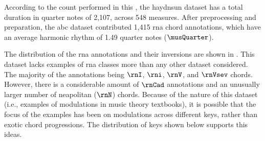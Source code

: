 
According to the count performed in this \thesisdiss{}, the
\gls{haydnsun} dataset has a total duration in quarter notes
of 2,107, across 548 measures. After preprocessing and
preparation, the \gls{abc} dataset contributed 1,415
\gls{rna} chord annotations, which have an average harmonic
rhythm of 1.49 quarter notes ($\musQuarter$).

The distribution of the \gls{rna} annotations and their
inversions are shown in . This
dataset lacks examples of \gls{rna} classes more than any
other dataset considered. The majority of the annotations
being $\rnI$, $\rni$, $\rnV$, and $\rnVsev$ chords. However,
there is a considerable amount of $\rnCad$ annotations and
an unusually larger number of \gls{neapolitan} ($\rnN$)
chords. Because of the nature of this dataset (i.e.,
examples of modulations in music theory textbooks), it is
possible that the focus of the examples has been on
modulations across different keys, rather than exotic chord
progressions. The distribution of keys shown below supports
this ideas.








